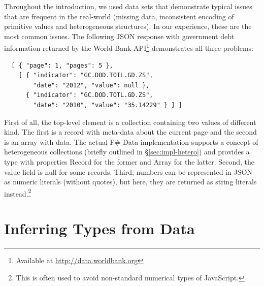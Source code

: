 \documentclass[10pt,preprint,blind,clearpagebib]{sigplanconf}
\newcommand{\kvd}[1]{\textnormal{\textcolor{kvdclr}{\sffamily #1}}}
\newcommand{\ident}[1]{\textnormal{\sffamily #1}}
\begin{document}
Throughout the introduction, we used data sets that demonstrate typical issues that are frequent
in the real-world (missing data, inconsistent encoding of primitive values and heterogeneous 
structures). In our experience, these are the most common issues. The following JSON response with 
government debt information returned by the World Bank API\footnote{Available at 
\url{http://data.worldbank.org}} demonstrates all three problems:
%
{\small{
\begin{verbatim}
  [ { "page": 1, "pages": 5 },
    [ { "indicator": "GC.DOD.TOTL.GD.ZS",
        "date": "2012", "value": null },
      { "indicator": "GC.DOD.TOTL.GD.ZS",
        "date": "2010", "value": "35.14229" } ] ]
\end{verbatim}
}}
%
\noindent
First of all, the top-level element is a collection containing two values of different kind.
The first is a record with meta-data about the current page and the second is an array with data. 
The actual F\# Data implementation supports a concept of heterogeneous collections (briefly outlined
in \S\ref{sec:impl-hetero}) and provides a type with properties \ident{Record} for the former and 
\ident{Array} for the latter. Second, the \ident{value} field is \kvd{null} for some records. Third, 
numbers can be represented in JSON as numeric literals (without quotes), but here, they are 
returned as string literals instead.\footnote{This is often used to avoid non-standard numerical 
types of JavaScript.}



%
%

\section{Inferring Types from Data}
\label{sec:inference}
\end{document}

